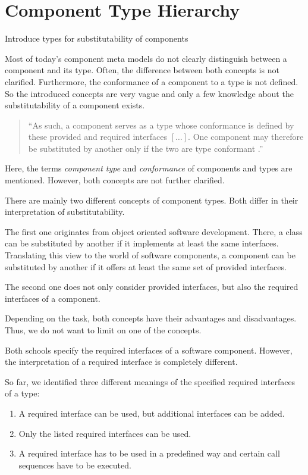 \section{Component Type Hierarchy}
\label{sec:ComponentTypes}

Introduce types for substitutability of components

Most of today's component meta models do not clearly distinguish between a
component and its type. Often, the difference between both concepts is
not clarified. Furthermore, the conformance of a component to a type is not
defined. So the introduced concepts are very vague and only a few knowledge
about the substitutability of a component exists.

\begin{quote}
``As such, a component serves as a type whose conformance is defined by these
provided and required interfaces $[\ldots]$. One component may therefore be
substituted by another only if the two are type conformant
\cite[p.142]{OMGUML2005a}.''
\end{quote}

Here, the terms \emph{component type} and \emph{conformance} of components and
types are mentioned. However, both concepts are not further clarified. 

There are mainly two different concepts of component types. Both differ in
their interpretation of substitutability. 

The first one originates from object
oriented software development. There, a class can be substituted by another if
it implements at least the same interfaces. Translating this view to the
world of software components, a component can be substituted by another if it
offers at least the same set of provided interfaces.

The second one does not only consider provided interfaces, but also the
required interfaces of a component.

Depending on the task, both concepts have their advantages and disadvantages.
Thus, we do not want to limit on one of the concepts.

Both schools specify the required interfaces of a software component. However,
the interpretation of a required interface is completely different.

So far, we identified three different meanings of the specified required
interfaces of a type:
\begin{enumerate}
\item	A required interface can be used, but additional interfaces can be
added.
\item	Only the listed required interfaces can be used.
\item	A required interface has to be used in a predefined way and certain call
sequences have to be executed. 
\end{enumerate}

